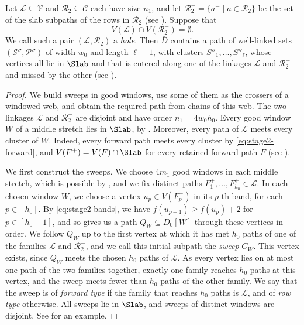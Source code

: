 \documentclass[fontsize=12pt,leading=14pt]{fullpaper}
\newcommand{\Ccal}{\mathcal{C}}
\newcommand{\Lcal}{\mathcal{L}}
\newcommand{\Pcal}{\mathcal{P}}
\newcommand{\Rcal}{\mathcal{R}}
\newcommand{\Scal}{\mathcal{S}}
\newcommand{\Vcal}{\mathcal{V}}
\begin{document}
\begin{theorem}\label{thm:hole}
  Let $\Lcal\subseteq\Vcal$ and $\Rcal_2\subseteq\Ccal$ each have size $n_1$, and let $\Rcal_2^-=\{a^-\mid a\in\Rcal_2\}$ be the set of the slab subpaths of the rows in $\Rcal_2$ (see ).
  Suppose that
  \[
    V(\Lcal)\cap V(\Rcal_2^-)=\emptyset.
  \]
  We call such a pair $(\Lcal,\Rcal_2)$ a \emph{hole}.
  Then $\bar D$ contains a path of well-linked sets $(\Scal'',\Pcal'')$ of width $w_0$ and length $\ell-1$, with clusters $S''_1,\dots,S''_\ell$, whose vertices all lie in $\Slab$ and that is entered along one of the linkages $\Lcal$ and $\Rcal_2^-$ and missed by the other (see ).
\end{theorem}

\begin{proof}
  We build sweeps in good windows, use some of them as the crossers of a windowed web, and obtain the required path from chains of this web.
  The two linkages $\Lcal$ and $\Rcal_2^-$ are disjoint and have order $n_1=4w_0h_0$.
  Every good window $W$ of a middle stretch lies in $\Slab$, by .
  Moreover, every path of $\Lcal$ meets every cluster of $W$.
  Indeed, every forward path meets every cluster by \eqref{eq:stage2-forward}, and $V(F^+)=V(F)\cap\Slab$ for every retained forward path $F$ (see ).

  We first construct the sweeps.
  We choose $4m_1$ good windows in each middle stretch, which is possible by , and we fix distinct paths $F_1^+,\dots,F_{h_0}^+\in\Lcal$.
  In each chosen window $W$, we choose a vertex $u_p\in V(F_p^+)$ in its $p$-th band, for each $p\in[h_0]$.
  By \eqref{eq:stage2-bands}, we have $f(u_{p+1})\ge f(u_p)+2$ for $p\in[h_0-1]$, and so  gives us a path $Q_W\subseteq D_0[W]$ through these vertices in order.
  We follow $Q_W$ up to the first vertex at which it has met $h_0$ paths of one of the families $\Lcal$ and $\Rcal_2^-$, and we call this initial subpath the \emph{sweep} $C_W$.
  This vertex exists, since $Q_W$ meets the chosen $h_0$ paths of $\Lcal$.
  As every vertex lies on at most one path of the two families together, exactly one family reaches $h_0$ paths at this vertex, and the sweep meets fewer than $h_0$ paths of the other family.
  We say that the sweep is of \emph{forward type} if the family that reaches $h_0$ paths is $\Lcal$, and of \emph{row type} otherwise.
  All sweeps lie in $\Slab$, and sweeps of distinct windows are disjoint.
  See  for an example.


\end{proof}
\end{document}
